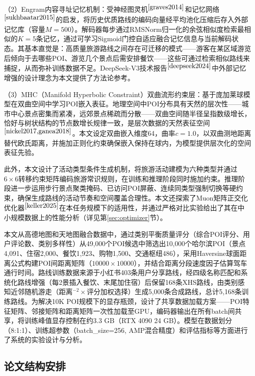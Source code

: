 \documentclass[12pt,a4paper]{ctexart}
\begin{document}
（2）Engram内容寻址记忆机制：受神经图灵机$^{\cite{graves2014}}$和记忆网络$^{\cite{sukhbaatar2015}}$的启发，将历史优质路线的编码向量经平均池化压缩后存入外部记忆库（容量$M=500$）。解码器每步通过RMSNorm归一化的余弦相似度检索最相似的$K=5$条记忆，通过可学习Sigmoid门控自适应融合记忆信息与当前解码状态。其基本直觉是：高质量旅游路线之间存在可迁移的模式——游客在某区域游览后倾向于去哪些POI、游览几个景点后需安排餐饮——这些可通过检索相似路线来捕捉，从而弥补训练数据不足。DeepSeek-V3技术报告$^{\cite{deepseek2024}}$中外部记忆增强的设计理念为本文提供了方法论参考。

（3）MHC（Manifold Hyperbolic Constraint）双曲流形约束层：基于庞加莱球模型在双曲空间中学习POI嵌入表征。地理空间中POI分布具有天然的层次性——城市中心景点密集而紧凑，远郊景点稀疏而分散——双曲空间随半径呈指数级增长，恰好与树状结构的节点数增长规律一致，是层次数据的天然表征空间$^{\cite{nickel2017,ganea2018}}$。本文设定双曲嵌入维度64，曲率$c=1.0$，以双曲测地距离替代欧氏距离，并施加正则化约束确保嵌入保持在球内，为模型提供层次化的空间表征先验。

此外，本文设计了活动类型条件生成机制，将旅游活动建模为六种类型并通过$6\times6$转移约束矩阵编码旅游常识规则，在训练和推理阶段同时施加约束。推理阶段进一步运用步行景点聚类掩码、已访问POI屏蔽、连续同类型强制切换等硬约束，确保生成路线的活动节奏和空间覆盖合理性。本文还探索了Muon矩阵正交化优化器$^{\cite{keller2025}}$在本任务规模下的适用性，并通过严格对比实验给出了其在中小规模数据上的性能分析（详见第\ref{sec:optimizer}节）。

本文从高德地图和天地图融合数据中，通过类别平衡质量评分（综合POI评分、用户评论数、类别多样性）从49,000个POI候选中筛选出10,000个哈尔滨POI（景点4,091、住宿2,000、餐饮1,923、购物1,500、交通枢纽486），采用Haversine球面距离公式构建POI间距离矩阵（$10000\times10000$），并结合距离分段速度因子估算驾车通行时间。路线训练数据来源于小红书403条用户分享路线，经四级名称匹配和系统化路线增强（每2景插入餐饮、末尾加住宿）后保留168条XHS路线，由类别感知近邻随机游走（距离$^{-2}\times$评分加权选择）生成5,000条合成路线，总计5,168条训练路线。为解决10K POI规模下的显存瓶颈，设计了共享数据加载方案——POI特征矩阵、邻接矩阵和距离矩阵一次性加载至GPU，编码器输出在所有batch间共享，将训练峰值显存控制在约3.3 GB（RTX 4090 24 GB）。模型在数据划分（8:1:1）、训练超参数（batch\_size=256, AMP混合精度）和评估指标等方面进行了系统的实验设计与分析。

\subsection{论文结构安排}
\end{document}
